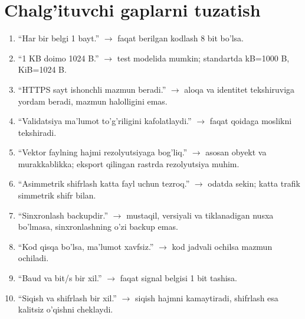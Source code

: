 \documentclass[11pt,a4paper,oneside]{book}
\begin{document}
\section{Chalg'ituvchi gaplarni tuzatish}
\begin{enumerate}
\item ``Har bir belgi 1 bayt.'' $\rightarrow$ faqat berilgan kodlash 8 bit bo'lsa.
\item ``1 KB doimo 1024 B.'' $\rightarrow$ test modelida mumkin; standartda kB=1000 B, KiB=1024 B.
\item ``HTTPS sayt ishonchli mazmun beradi.'' $\rightarrow$ aloqa va identitet tekshiruviga yordam beradi, mazmun halolligini emas.
\item ``Validatsiya ma'lumot to'g'riligini kafolatlaydi.'' $\rightarrow$ faqat qoidaga moslikni tekshiradi.
\item ``Vektor faylning hajmi rezolyutsiyaga bog'liq.'' $\rightarrow$ asosan obyekt va murakkablikka; eksport qilingan rastrda rezolyutsiya muhim.
\item ``Asimmetrik shifrlash katta fayl uchun tezroq.'' $\rightarrow$ odatda sekin; katta trafik simmetrik shifr bilan.
\item ``Sinxronlash backupdir.'' $\rightarrow$ mustaqil, versiyali va tiklanadigan nusxa bo'lmasa, sinxronlashning o'zi backup emas.
\item ``Kod qisqa bo'lsa, ma'lumot xavfsiz.'' $\rightarrow$ kod jadvali ochilsa mazmun ochiladi.
\item ``Baud va bit/s bir xil.'' $\rightarrow$ faqat signal belgisi 1 bit tashisa.
\item ``Siqish va shifrlash bir xil.'' $\rightarrow$ siqish hajmni kamaytiradi, shifrlash esa kalitsiz o'qishni cheklaydi.
\end{enumerate}
\end{document}
